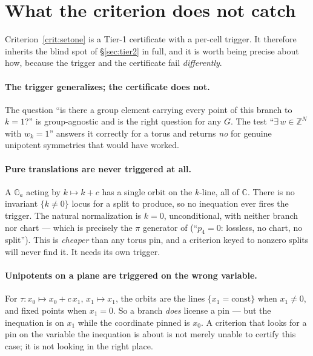 \documentclass[11pt]{article}
\newcommand{\Ga}{\mathbb{G}_a}
\newcommand{\CC}{\mathbb{C}}
\newcommand{\ZZ}{\mathbb{Z}}
\theoremstyle{plain}
\theoremstyle{definition}
\theoremstyle{remark}
\begin{document}
\section{What the criterion does not catch}
\label{sec:gap}

Criterion~\ref{crit:setone} is a Tier-1 certificate with a per-cell trigger. It
therefore inherits the blind spot of \S\ref{sec:tier2} in full, and it is worth
being precise about how, because the trigger and the certificate fail
\emph{differently}.

\paragraph{The trigger generalizes; the certificate does not.} The question
``is there a group element carrying every point of this branch to $k=1$?'' is
group-agnostic and is the right question for any $G$. The test
``$\exists\, w \in \ZZ^N$ with $w_k = 1$'' answers it correctly for a torus and
returns \emph{no} for genuine unipotent symmetries that would have worked.

\paragraph{Pure translations are never triggered at all.} A $\Ga$ acting by
$k \mapsto k + c$ has a single orbit on the $k$-line, all of $\CC$. There is no
invariant $\{k \neq 0\}$ locus for a split to produce, so no inequation ever
fires the trigger. The natural normalization is $k = 0$, unconditional, with
neither branch nor chart --- which is precisely the $\pi$ generator of
\cite{ansatz25} (``$p_4 = 0$: lossless, no chart, no split''). This is
\emph{cheaper} than any torus pin, and a criterion keyed to nonzero splits will
never find it. It needs its own trigger.

\paragraph{Unipotents on a plane are triggered on the wrong variable.} For
$\tau : x_0 \mapsto x_0 + c\,x_1$, $x_1 \mapsto x_1$, the orbits are the lines
$\{x_1 = \text{const}\}$ when $x_1 \neq 0$, and fixed points when $x_1 = 0$. So
a branch \emph{does} license a pin --- but the inequation is on $x_1$ while the
coordinate pinned is $x_0$. A criterion that looks for a pin on the variable
the inequation is about is not merely unable to certify this case; it is not
looking in the right place.
\end{document}
